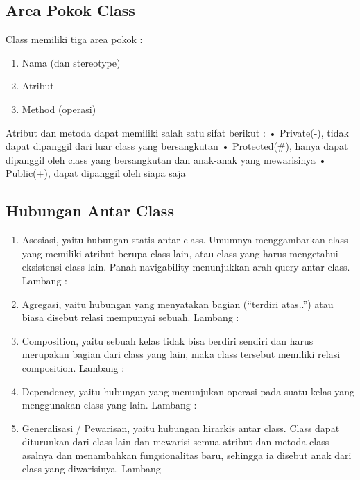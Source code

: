 \subsection{Area Pokok Class}
Class memiliki tiga area pokok :
\begin{enumerate}
\item
Nama (dan stereotype)
\item
Atribut
\item
Method (operasi)
\end{enumerate}
Atribut dan metoda dapat memiliki salah satu sifat berikut :
• Private(-), tidak dapat dipanggil dari luar class yang bersangkutan
• Protected(\#), hanya dapat dipanggil oleh class yang bersangkutan dan anak-anak yang
mewarisinya
• Public(+), dapat dipanggil oleh siapa saja

\subsection{Hubungan Antar Class}
\begin{enumerate}
\item
Asosiasi, yaitu hubungan statis antar class. Umumnya menggambarkan class yang
memiliki atribut berupa class lain, atau class yang harus mengetahui eksistensi
class lain. Panah navigability menunjukkan arah query antar class.
Lambang :
\item
Agregasi, yaitu hubungan yang menyatakan bagian (“terdiri atas..”) atau biasa
disebut relasi mempunyai sebuah.
Lambang :
\item
Composition, yaitu sebuah kelas tidak bisa berdiri sendiri dan harus merupakan
bagian dari class yang lain, maka class tersebut memiliki relasi composition.
Lambang :
\item
Dependency, yaitu hubungan yang menunjukan operasi pada suatu kelas yang
menggunakan class yang lain.
Lambang :
\item
Generalisasi / Pewarisan, yaitu hubungan hirarkis antar class. Class dapat
diturunkan dari class lain dan mewarisi semua atribut dan metoda class asalnya
dan menambahkan fungsionalitas baru, sehingga ia disebut anak dari class yang
diwarisinya.
Lambang
\end{enumerate}




